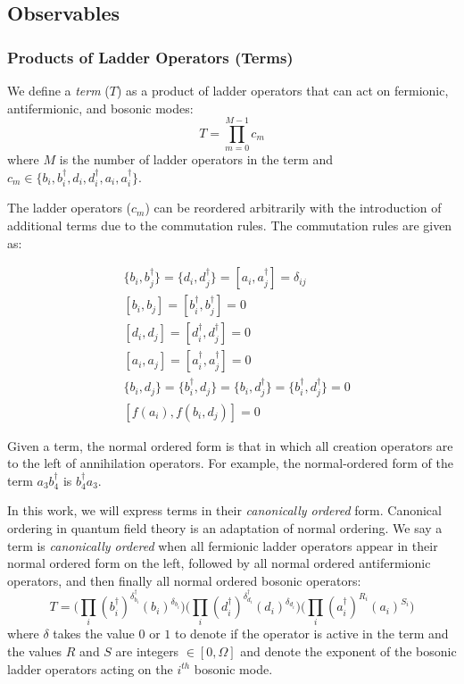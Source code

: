 \subsection{Observables}
\label{subsec:observables}

\subsubsection{Products of Ladder Operators (Terms)}

We define a \textit{term} ($T$) as a product of ladder operators that can act on fermionic, antifermionic, and bosonic modes:
\begin{equation}
    T = \prod_{m=0}^{M-1} c_m
\end{equation}
where $M$ is the number of ladder operators in the term and $c_m \in \{b_i, b_i^\dagger, d_i, d_i^\dagger, a_i, a_i^\dagger\}$.

The ladder operators ($c_m$) can be reordered arbitrarily with the introduction of additional terms due to the commutation rules.
The commutation rules are given as:

\begin{equation}
    \label{eq:commutation}
    \begin{split}
        &\{b_i, b_j^\dagger\} = \{d_i, d_j^\dagger\} = [a_i, a_j^\dagger] = \delta_{ij}\\
        & [b_i, b_j] = [b_i^\dagger, b_j^\dagger] = 0 \\
        & [d_i, d_j] = [d_i^\dagger, d_j^\dagger] = 0 \\
        & [a_i, a_j] = [a_i^\dagger, a_j^\dagger] = 0 \\
        & \{b_i, d_j\} = \{b_i^\dagger, d_j\} = \{b_i, d_j^\dagger\} = \{b_i^\dagger, d_j^\dagger\} = 0\\
        & [f(a_i), f(b_i, d_j)] = 0
    \end{split}
\end{equation}

Given a term, the normal ordered form is that in which all creation operators are to the left of annihilation operators.
For example, the normal-ordered form of the term $a_3 b_4^\dagger$ is $b_4^\dagger a_3$.

In this work, we will express terms in their \emph{canonically ordered} form.
Canonical ordering in quantum field theory is an adaptation of normal ordering.
We say a term is \textit{canonically ordered} when all fermionic ladder operators appear in their normal ordered form on the left, followed by all normal ordered antifermionic operators, and then finally all normal ordered bosonic operators:
\begin{equation}
    T = \Big( \prod_i (b_i^\dagger)^{\delta_{b_i}^{\dagger}} (b_i)^{\delta_{b_i}} \Big) \Big( \prod_i (d_i^\dagger)^{\delta_{d_i}^{\dagger}} (d_i)^{\delta_{d_i}} \Big)   \Big( \prod_i (a_i^\dagger)^{R_i}(a_i)^{S_i} \Big) 
\end{equation}
where $\delta$ takes the value $0$ or $1$ to denote if the operator is active in the term and the values $R$ and $S$ are integers $\in [0, \Omega]$ and denote the exponent of the bosonic ladder operators acting on the $i^{th}$ bosonic mode.

